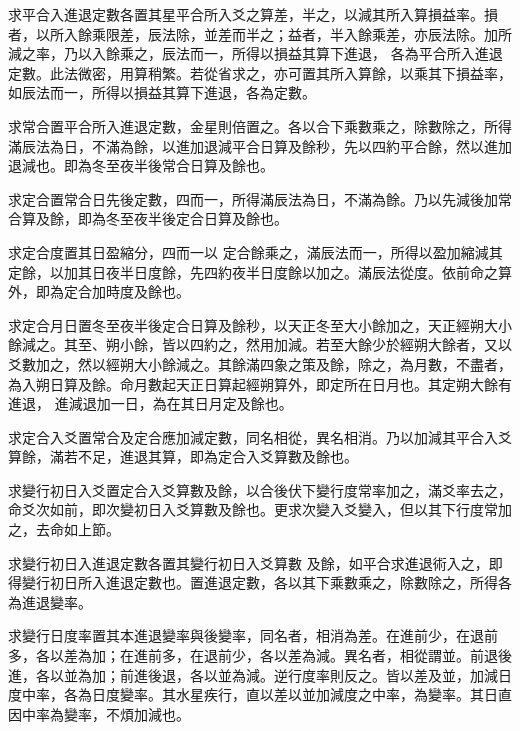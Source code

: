 \begin{pinyinscope}
 求平合入進退定數各置其星平合所入爻之算差，半之，以減其所入算損益率。損者，以所入餘乘限差，辰法除，並差而半之；益者，半入餘乘差，亦辰法除。加所減之率，乃以入餘乘之，辰法而一，所得以損益其算下進退，
 各為平合所入進退定數。此法微密，用算稍繁。若從省求之，亦可置其所入算餘，以乘其下損益率，如辰法而一，所得以損益其算下進退，各為定數。



 求常合置平合所入進退定數，金星則倍置之。各以合下乘數乘之，除數除之，所得滿辰法為日，不滿為餘，以進加退減平合日算及餘秒，先以四約平合餘，然以進加退減也。即為冬至夜半後常合日算及餘也。



 求定合置常合日先後定數，四而一，所得滿辰法為日，不滿為餘。乃以先減後加常合算及餘，即為冬至夜半後定合日算及餘也。



 求定合度置其日盈縮分，四而一以
 定合餘乘之，滿辰法而一，所得以盈加縮減其定餘，以加其日夜半日度餘，先四約夜半日度餘以加之。滿辰法從度。依前命之算外，即為定合加時度及餘也。



 求定合月日置冬至夜半後定合日算及餘秒，以天正冬至大小餘加之，天正經朔大小餘減之。其至、朔小餘，皆以四約之，然用加減。若至大餘少於經朔大餘者，又以爻數加之，然以經朔大小餘減之。其餘滿四象之策及餘，除之，為月數，不盡者，為入朔日算及餘。命月數起天正日算起經朔算外，即定所在日月也。其定朔大餘有進退，
 進減退加一日，為在其日月定及餘也。



 求定合入爻置常合及定合應加減定數，同名相從，異名相消。乃以加減其平合入爻算餘，滿若不足，進退其算，即為定合入爻算數及餘也。



 求變行初日入爻置定合入爻算數及餘，以合後伏下變行度常率加之，滿爻率去之，命爻次如前，即次變初日入爻算數及餘也。更求次變入爻變入，但以其下行度常加之，去命如上節。



 求變行初日入進退定數各置其變行初日入爻算數
 及餘，如平合求進退術入之，即得變行初日所入進退定數也。置進退定數，各以其下乘數乘之，除數除之，所得各為進退變率。



 求變行日度率置其本進退變率與後變率，同名者，相消為差。在進前少，在退前多，各以差為加；在進前多，在退前少，各以差為減。異名者，相從謂並。前退後進，各以並為加；前進後退，各以並為減。逆行度率則反之。皆以差及並，加減日度中率，各為日度變率。其水星疾行，直以差以並加減度之中率，為變率。其日直因中率為變率，不煩加減也。




\end{pinyinscope}
